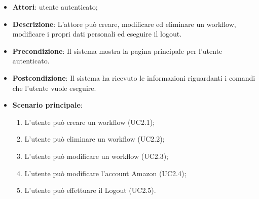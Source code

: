 \begin{itemize}
	\item \textbf{Attori}: utente autenticato;
	\item \textbf{Descrizione}: L'attore può creare, modificare ed eliminare un workflow, modificare i propri dati personali ed eseguire il logout.
	\item \textbf{Precondizione}: Il sistema mostra la pagina principale per l'utente autenticato.
	\item \textbf{Postcondizione}: Il sistema ha ricevuto le informazioni riguardanti i comandi che l'utente vuole eseguire.
	\item \textbf{Scenario principale}:
	\begin{enumerate} \item L'utente può creare un workflow (UC2.1);  \item  L'utente può eliminare un workflow (UC2.2);  \item 
		L'utente può modificare un workflow (UC2.3);  \item  L'utente può modificare l'account Amazon (UC2.4);  \item 
		L'utente può effettuare il Logout (UC2.5).\end{enumerate}
\end{itemize}

